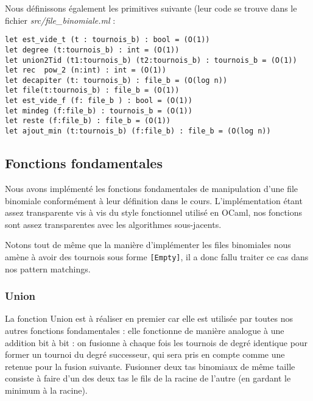 \documentclass[12pt,a4paper]{article}
\begin{document}
Nous définissons également les primitives suivante (leur code se trouve dans le fichier \textit{src/file\_binomiale.ml} :

\bigskip \begin{lstlisting}
let est_vide_t (t : tournois_b) : bool = (O(1))
let degree (t:tournois_b) : int = (O(1))
let union2Tid (t1:tournois_b) (t2:tournois_b) : tournois_b = (O(1))
let rec  pow_2 (n:int) : int = (O(1))
let decapiter (t: tournois_b) : file_b = (O(log n))
let file(t:tournois_b) : file_b = (O(1))
let est_vide_f (f: file_b ) : bool = (O(1))
let mindeg (f:file_b) : tournois_b = (O(1))
let reste (f:file_b) : file_b = (O(1))
let ajout_min (t:tournois_b) (f:file_b) : file_b = (O(log n))
\end{lstlisting} \bigskip

\subsection{Fonctions fondamentales}
Nous avons implémenté les fonctions fondamentales de manipulation d'une file binomiale conformément à leur définition dans le cours. L'implémentation étant assez transparente vis à vis du style fonctionnel utilisé en OCaml, nos fonctions sont assez transparentes avec les algorithmes sous-jacents.

Notons tout de même que la manière d'implémenter les files binomiales nous amène à avoir des tournois sous forme \texttt{[Empty]}, il a donc fallu traiter ce cas dans nos pattern matchings.

\subsubsection{Union}

La fonction Union est à réaliser en premier car elle est utilisée par toutes nos autres fonctions fondamentales : elle fonctionne de manière analogue à une addition bit à bit : on fusionne à chaque fois les tournois de degré identique pour former un tournoi du degré successeur, qui sera pris en compte comme une retenue pour la fusion suivante. Fusionner deux tas binomiaux de même taille consiste à faire d'un des deux tas le fils de la racine de l'autre (en gardant le minimum à la racine).
\end{document}
